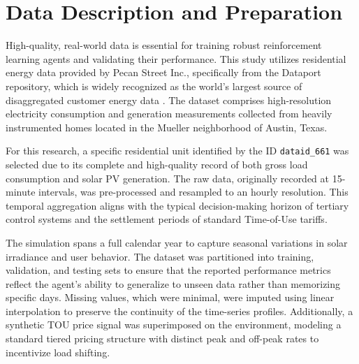 
\section{Data Description and Preparation}

High-quality, real-world data is essential for training robust reinforcement learning agents and validating their performance. This study utilizes residential energy data provided by Pecan Street Inc., specifically from the Dataport repository, which is widely recognized as the world's largest source of disaggregated customer energy data \cite{ref_pecan_street}. The dataset comprises high-resolution electricity consumption and generation measurements collected from heavily instrumented homes located in the Mueller neighborhood of Austin, Texas.

For this research, a specific residential unit identified by the ID \texttt{dataid\_661} was selected due to its complete and high-quality record of both gross load consumption and solar PV generation. The raw data, originally recorded at 15-minute intervals, was pre-processed and resampled to an hourly resolution. This temporal aggregation aligns with the typical decision-making horizon of tertiary control systems and the settlement periods of standard Time-of-Use tariffs.

The simulation spans a full calendar year to capture seasonal variations in solar irradiance and user behavior. The dataset was partitioned into training, validation, and testing sets to ensure that the reported performance metrics reflect the agent's ability to generalize to unseen data rather than memorizing specific days. Missing values, which were minimal, were imputed using linear interpolation to preserve the continuity of the time-series profiles. Additionally, a synthetic TOU price signal was superimposed on the environment, modeling a standard tiered pricing structure with distinct peak and off-peak rates to incentivize load shifting.
